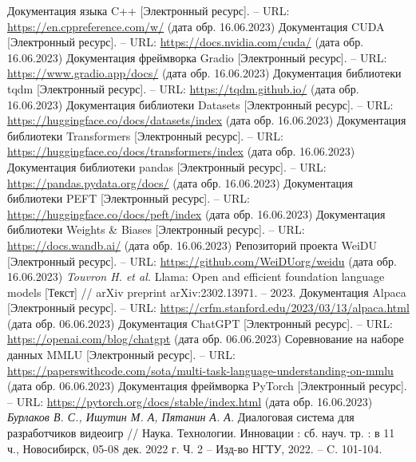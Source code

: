 \begin{thebibliography}{99}
  Документация языка C++ [Электронный ресурс]. -- URL: \url{https://en.cppreference.com/w/} (дата обр. 16.06.2023)
  Документация CUDA [Электронный ресурс]. -- URL: \url{https://docs.nvidia.com/cuda/} (дата обр. 16.06.2023)
  Документация фреймворка Gradio [Электронный ресурс]. -- URL: \url{https://www.gradio.app/docs/} (дата обр. 16.06.2023)
  Документация библиотеки tqdm [Электронный ресурс]. -- URL: \url{https://tqdm.github.io/} (дата обр. 16.06.2023)
  Документация библиотеки Datasets [Электронный ресурс]. -- URL: \url{https://huggingface.co/docs/datasets/index} (дата обр. 16.06.2023)
  Документация библиотеки Transformers [Электронный ресурс]. -- URL: \url{https://huggingface.co/docs/transformers/index} (дата обр. 16.06.2023)
  Документация библиотеки pandas [Электронный ресурс]. -- URL: \url{https://pandas.pydata.org/docs/} (дата обр. 16.06.2023)
  Документация библиотеки PEFT [Электронный ресурс]. -- URL: \url{https://huggingface.co/docs/peft/index} (дата обр. 16.06.2023)
  Документация библиотеки Weights \& Biases [Электронный ресурс]. -- URL: \url{https://docs.wandb.ai/} (дата обр. 16.06.2023)
  Репозиторий проекта WeiDU [Электронный ресурс]. -- URL: \url{https://github.com/WeiDUorg/weidu} (дата обр. 16.06.2023)
  \textit{Touvron H. et al.} Llama: Open and efficient foundation language models [Текст] // arXiv preprint arXiv:2302.13971. – 2023.
  Документация Alpaca [Электронный ресурс]. -- URL: \url{https://crfm.stanford.edu/2023/03/13/alpaca.html} (дата обр. 06.06.2023)
  Документация ChatGPT [Электронный ресурс]. -- URL: \url{https://openai.com/blog/chatgpt} (дата обр. 06.06.2023)
  Соревнование на наборе данных MMLU [Электронный ресурс]. -- URL: \url{https://paperswithcode.com/sota/multi-task-language-understanding-on-mmlu} (дата обр. 06.06.2023)
  Документация фреймворка PyTorch [Электронный ресурс]. -- URL: \url{https://pytorch.org/docs/stable/index.html} (дата обр. 16.06.2023)
  \textit{Бурлаков В. С., Ишутин М. А, Пятанин А. А.} Диалоговая система для разработчиков видеоигр // Наука. Технологии. Инновации : сб. науч. тр. : в 11 ч., Новосибирск, 05-08 дек. 2022 г. Ч. 2 -- Изд-во НГТУ, 2022. -- C. 101-104.
\end{thebibliography}